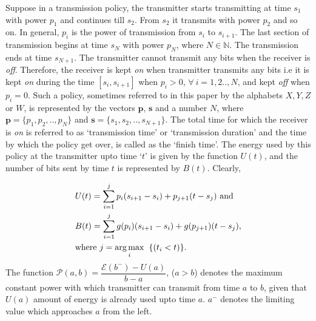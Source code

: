 Suppose in a transmission policy, the transmitter starts transmitting at time $s_1$ with power $p_1$ and continues till $s_2$. From $s_2$ it transmits with power $p_2$ and so on. In general, $p_i$ is the power of transmission from $s_i$ to $s_{i+1}$. The last section of transmission begins at time $s_N$ with power $p_N$, where $N\in \mathbb{N}$. The transmission ends at time $s_{N+1}$. The transmitter cannot transmit any bits when the receiver is \textit{off}. Therefore, the receiver is kept \textit{on} when transmitter transmits any bits i.e it is kept \textit{on} during the time $[s_i,s_{i+1}]$ when $p_i > 0$, $\forall \ i=1,2..,N$, and kept \textit{off} when $p_i=0$. Such a policy, sometimes referred to in this paper by the alphabets $X,Y,Z$ or $W$, is represented by the vectors $\bm{p}$, $\bm{s}$ and a number $N$, where $\bm{p}=\{p_1, p_2, .., p_N\}$ and $\bm{s}=\{s_1, s_2, .., s_{N+1}\}$. The total time for which the receiver is \textit{on} is referred to as `transmission time' or `transmission duration' and the time by which the policy get over, is called as the `finish time'. The energy used by this policy at the transmitter upto time `$t$' is given by the function $U(t)$, and the number of bits sent by time $t$ is represented by $B(t)$. Clearly,

\begin{align}
&U(t)=\sum_{i=1}^{j} p_i(s_{i+1}-s_i)+p_{j+1}(t-s_j) \text{ and }
\\
&B(t)=\sum_{i=1}^{j} g(p_i)(s_{i+1}-s_i)+g(p_{j+1})(t-s_j),
\\
&\text{where }j=\argmax_{i} \hspace{2mm}\{(t_i<t)\}.\nonumber
\end{align}
The function $\mathcal{P}(a,b)=\dfrac{\mathcal{E}(b^- )-U(a)}{b-a}$,  ($a>b$) denotes the maximum constant power with which transmitter can transmit from time $a$ to $b$, given that $U(a)$ amount of energy is already used upto time $a$. $a^-$ denotes the limiting value which approaches $a$ from the left.

